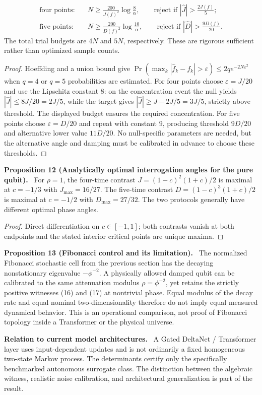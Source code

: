 \documentclass[11pt,a4paper,oneside]{book}
\newcommand{\statement}[3]{\par\medskip\noindent\textbf{#1 #2 (#3).}\ }
\newcommand{\note}[1]{\par\medskip\noindent\textbf{#1}\ }
\begin{document}
\begin{align}
\text{four points:}\quad&N\ge\frac{200}{J(f)^2}\log\frac8\alpha,\qquad\text{reject if }|\widehat J|>\frac{2J(f)}5;\tag{19}\\
\text{five points:}\quad&N\ge\frac{200}{D(f)^2}\log\frac{10}\alpha,\qquad\text{reject if }|\widehat D|>\frac{9D(f)}{20}.\tag{20}
\end{align}
The total trial budgets are $4N$ and $5N$, respectively. These are rigorous sufficient rather than optimized sample counts.
\begin{proof}Hoeffding and a union bound give $\Pr(\max_k|\widehat f_k-f_k|>\varepsilon)\le2qe^{-2N\varepsilon^2}$ when $q=4$ or $q=5$ probabilities are estimated. For four points choose $\varepsilon=J/20$ and use the Lipschitz constant $8$: on the concentration event the null yields $|\widehat J|\le8J/20=2J/5$, while the target gives $|\widehat J|\ge J-2J/5=3J/5$, strictly above threshold. The displayed budget ensures the required concentration. For five points choose $\varepsilon=D/20$ and repeat with constant $9$, producing threshold $9D/20$ and alternative lower value $11D/20$. No null-specific parameters are needed, but the alternative angle and damping must be calibrated in advance to choose these thresholds.\end{proof}
\statement{Proposition}{12}{Analytically optimal interrogation angles for the pure qubit} For $\rho=1$, the four-time contrast $J=(1-c)^2(1+c)/2$ is maximal at $c=-1/3$ with $J_{\max}=16/27$. The five-time contrast $D=(1-c)^3(1+c)/2$ is maximal at $c=-1/2$ with $D_{\max}=27/32$. The two protocols generally have different optimal phase angles.
\begin{proof}Direct differentiation on $c\in[-1,1]$; both contrasts vanish at both endpoints and the stated interior critical points are unique maxima.\end{proof}
\statement{Proposition}{13}{Fibonacci control and its limitation} The normalized Fibonacci stochastic cell from the previous section has the decaying nonstationary eigenvalue $-\phi^{-2}$. A physically allowed damped qubit can be calibrated to the same attenuation modulus $\rho=\phi^{-2}$, yet retains the strictly positive witnesses (16) and (17) at nontrivial phase. Equal modulus of the decay rate and equal nominal two-dimensionality therefore do not imply equal measured dynamical behavior. This is an operational comparison, not proof of Fibonacci topology inside a Transformer or the physical universe.
\note{Relation to current model architectures.} A Gated DeltaNet / Transformer layer uses input-dependent updates and is not ordinarily a fixed homogeneous two-state Markov process. The determinants certify only the specifically benchmarked autonomous surrogate class. The distinction between the algebraic witness, realistic noise calibration, and architectural generalization is part of the result.
\end{document}
